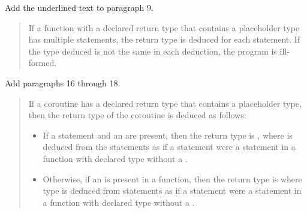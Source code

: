Add the underlined text to paragraph 9.

\begin{quote}
\setcounter{Paras}{8}
\pnum
If a function with a declared return type that contains a placeholder type has
multiple  statements, the return type is deduced for each
 statement. If the type deduced is not the same in each
deduction, the program is ill-formed.
\end{quote}

Add paragraphs 16 through 18.

\begin{quote}
\setcounter{Paras}{15}

%

\pnum
If a coroutine has a declared return type that contains a placeholder type, then the return type of the coroutine is deduced as follows:

\begin{itemize}
\item If a  statement and an  are present, then
the return type is , where  is deduced from the  statements as if a  statement were a  statement in a function with declared type  without a .


\item Otherwise, if an  is present in a function, then
the return type is\linebreak {} where type  is deduced from 
 statements as if a  statement were a  statement in a function with declared type  without a .


\end{itemize}
\end{quote}

